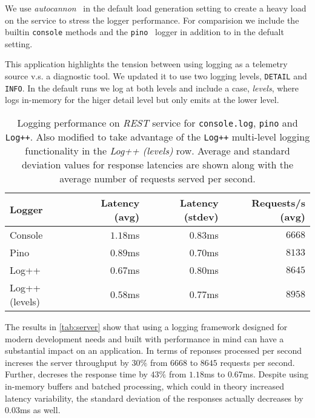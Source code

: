 We use \emph{autocannon}~\cite{autocannon} in the default load generation 
setting to create a heavy load on the service to stress the logger performance.
For comparision we include the builtin \texttt{console} methods 
and the \texttt{pino}~\cite{pinologger} logger in addition to \projn in the defualt 
setting.

This application highlights the tension between using logging as a telemetry source 
v.s. a diagnostic tool. We updated it to use two logging levels, \texttt{DETAIL} 
and \texttt{INFO}. In the default runs we log at both levels and include a case, 
\emph{levels}, where \projn logs in-memory for the higer detail level but only 
emits at the lower level.

\begin{table}[t]  
    \centering
    {\small
    \begin{tabular}{l | r r r }
    Logger       & Latency (avg) & Latency (stdev) & Requests/s (avg) \\
    \hline
    Console        & $1.18$ms & $0.83$ms & $6668$   \\
    Pino           & $0.89$ms & $0.70$ms & $8133$   \\
    Log++          & $0.67$ms & $0.80$ms & $8645$   \\
    Log++ (levels) & $0.58$ms & $0.77$ms & $8958$   \\
    \end{tabular}
    }
    \vspace{2mm}
    \caption{\small Logging performance on \emph{REST} service for \texttt{console.log}, 
    \texttt{pino} and \texttt{Log++}. Also modified to take advantage of the \texttt{Log++} 
    multi-level logging functionality in the \emph{Log++ (levels)} row. Average and 
    standard deviation values for response latencies are shown along with the average 
    number of requests served per second.}
    \label{tab:server}
\end{table}

The results in \autoref{tab:server} show that using a logging framework designed 
for modern development needs and built with performance in mind can have a 
substantial impact on an application. In terms of reponses processed per second 
\projn increses the server throughput by $30\%$ from $6668$ to $8645$ requests 
per second. Further, \projn decreses the response time by $43\%$ 
from $1.18$ms to $0.67$ms. Despite using in-memory buffers and batched processing, 
which could in theory increased latency variability, the standard deviation of 
the responses actually decreases by $0.03$ms as well.

